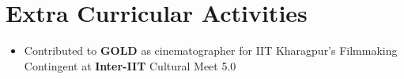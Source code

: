 \documentclass[letterpaper,11pt]{article}
\makeatletter
\newcommand{\resumeItem}[1]{
  \item\small{
    {#1 \vspace{-2pt}}
  }
}
\newcommand{\resumeSubheading}[4]{
  \vspace{-2pt}\item
    \begin{tabular*}{1.0\textwidth}[t]{l@{\extracolsep{\fill}}r}
      \textbf{#1} & \textbf{\small #2} \\
      \textit{\small#3} & \textit{\small #4} \\
    \end{tabular*}\vspace{-7pt}
}
\newcommand{\resumeSubHeadingListStart}{\begin{itemize}[leftmargin=0.0in, label={}]}
\newcommand{\resumeSubHeadingListEnd}{\end{itemize}}
\newcommand{\resumeItemListStart}{\begin{itemize}}
\newcommand{\resumeItemListEnd}{\end{itemize}\vspace{-5pt}}
\makeatother
\begin{document}


\section{Extra Curricular Activities}
  \resumeSubHeadingListStart
    \resumeItemListStart
      \vspace{-1mm}
      \resumeItem{Contributed to \textbf{GOLD} as cinematographer for IIT Kharagpur's Filmmaking Contingent at \textbf{Inter-IIT} Cultural Meet 5.0}
    \resumeItemListEnd
  \resumeSubHeadingListEnd

\end{document}
